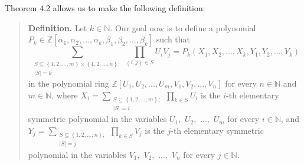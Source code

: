 \documentclass[12pt,final,notitlepage,onecolumn,german]{article}%
\begin{document}
Theorem 4.2 allows us to make the following definition:

\begin{quote}
\textbf{Definition.} Let $k\in\mathbb{N}$. Our goal now is to define a
polynomial $P_{k}\in\mathbb{Z}\left[  \alpha_{1},\alpha_{2},...,\alpha
_{k},\beta_{1},\beta_{2},...,\beta_{k}\right]  $ such that%
\begin{equation}
\sum_{\substack{S\subseteq\left\{  1,2,...,m\right\}  \times\left\{
1,2,...,n\right\}  ;\\\left\vert S\right\vert =k}}\prod_{\left(  i,j\right)
\in S}U_{i}V_{j}=P_{k}\left(  X_{1},X_{2},...,X_{k},Y_{1},Y_{2},...,Y_{k}%
\right)  \label{Pk1}%
\end{equation}
in the polynomial ring $\mathbb{Z}\left[  U_{1},U_{2},...,U_{m},V_{1}%
,V_{2},...,V_{n}\right]  $ for every $n\in\mathbb{N}$ and $m\in\mathbb{N}$,
where $X_{i}=\sum\limits_{\substack{S\subseteq\left\{  1,2,...,m\right\}
;\\\left\vert S\right\vert =i}}\prod\limits_{k\in S}U_{i}$ is the $i$-th
elementary symmetric polynomial in the variables $U_{1},$ $U_{2},$ $...,$
$U_{m}$ for every $i\in\mathbb{N}$, and $Y_{j}=\sum
\limits_{\substack{S\subseteq\left\{  1,2,...,n\right\}  ;\\\left\vert
S\right\vert =j}}\prod\limits_{k\in S}V_{j}$ is the $j$-th elementary
symmetric polynomial in the variables $V_{1},$ $V_{2},$ $...,$ $V_{n}$ for
every $j\in\mathbb{N}$.


\end{quote}
\end{document}
